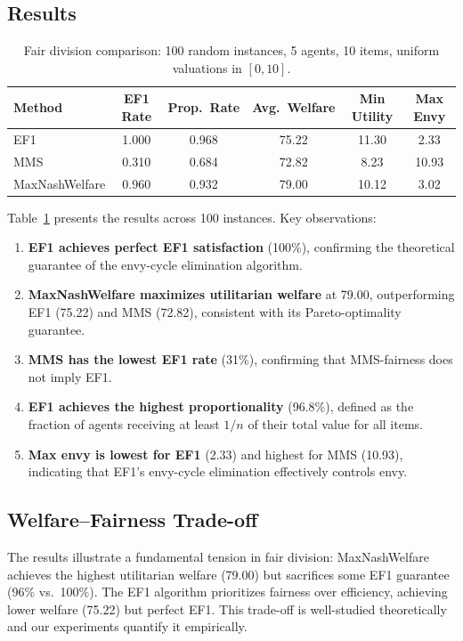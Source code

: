 \documentclass[10pt]{article}
\begin{document}
\subsection{Results}

\begin{table}[t]
\centering
\caption{Fair division comparison: 100 random instances, 5 agents, 10 items, uniform valuations in $[0,10]$.}
\label{tab:fairdiv}
\begin{tabular}{lccccc}
\toprule
\textbf{Method} & \textbf{EF1 Rate} & \textbf{Prop.\ Rate} & \textbf{Avg.\ Welfare} & \textbf{Min Utility} & \textbf{Max Envy} \\
\midrule
EF1           & 1.000 & 0.968 & 75.22 & 11.30 & 2.33 \\
MMS           & 0.310 & 0.684 & 72.82 &  8.23 & 10.93 \\
MaxNashWelfare & 0.960 & 0.932 & 79.00 & 10.12 &  3.02 \\
\bottomrule
\end{tabular}
\end{table}

Table~\ref{tab:fairdiv} presents the results across 100 instances. Key observations:

\begin{enumerate}[leftmargin=*,itemsep=2pt]
  \item \textbf{EF1 achieves perfect EF1 satisfaction} (100\%), confirming the theoretical guarantee of the envy-cycle elimination algorithm.
  \item \textbf{MaxNashWelfare maximizes utilitarian welfare} at 79.00, outperforming EF1 (75.22) and MMS (72.82), consistent with its Pareto-optimality guarantee.
  \item \textbf{MMS has the lowest EF1 rate} (31\%), confirming that MMS-fairness does not imply EF1.
  \item \textbf{EF1 achieves the highest proportionality} (96.8\%), defined as the fraction of agents receiving at least $1/n$ of their total value for all items.
  \item \textbf{Max envy is lowest for EF1} (2.33) and highest for MMS (10.93), indicating that EF1's envy-cycle elimination effectively controls envy.
\end{enumerate}

\subsection{Welfare--Fairness Trade-off}

The results illustrate a fundamental tension in fair division: MaxNashWelfare achieves the highest utilitarian welfare (79.00) but sacrifices some EF1 guarantee (96\% vs.\ 100\%). The EF1 algorithm prioritizes fairness over efficiency, achieving lower welfare (75.22) but perfect EF1. This trade-off is well-studied theoretically~\citep{caragiannis2019unreasonable} and our experiments quantify it empirically.
\end{document}

